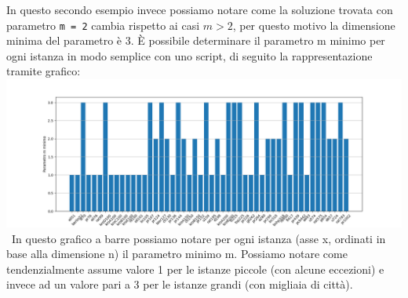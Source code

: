 \documentclass[a4paper,12pt]{report}
\begin{document}
In questo secondo esempio invece possiamo notare come la soluzione trovata con parametro \lstinline!m = 2! cambia rispetto ai casi $m > 2$, per questo motivo la dimensione minima del parametro è 3. È possibile determinare il parametro m minimo per ogni istanza in modo semplice con uno script, di seguito la rappresentazione tramite grafico:\newline
\includegraphics[width=1\textwidth]{../Grafici/1.png} \
In questo grafico a barre possiamo notare per ogni istanza (asse x, ordinati in base alla dimensione n) il parametro minimo m. Possiamo notare come tendenzialmente assume valore 1 per le istanze piccole (con alcune eccezioni) e invece ad un valore pari a 3 per le istanze grandi (con migliaia di città).
\end{document}
